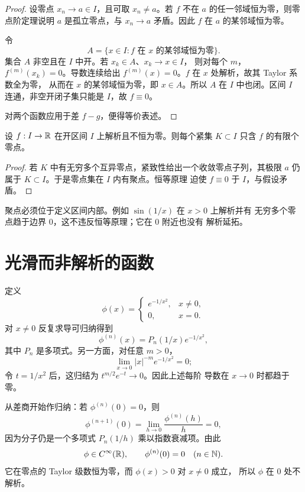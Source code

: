 \begin{proof}
设零点 \(x_n\to a\in I\)，且可取 \(x_n\ne a\)。若 \(f\) 不在
\(a\) 的任一邻域恒为零，则零点阶定理说明 \(a\) 是孤立零点，与
\(x_n\to a\) 矛盾。因此 \(f\) 在 \(a\) 的某邻域恒为零。

令
\[
 A=\{x\in I:f\text{ 在 }x\text{ 的某邻域恒为零}\}.
\]
集合 \(A\) 非空且在 \(I\) 中开。若 \(x_k\in A\)、\(x_k\to x\in I\)，
则对每个 \(m\)，\(f^{(m)}(x_k)=0\)。导数连续给出
\(f^{(m)}(x)=0\)。\(f\) 在 \(x\) 处解析，故其 Taylor 系数全为零，
从而在 \(x\) 的某邻域恒为零，即 \(x\in A\)。所以 \(A\) 在 \(I\)
中也闭。区间 \(I\) 连通，非空开闭子集只能是 \(I\)，故 \(f\equiv0\)。

对两个函数应用于差 \(f-g\)，便得等价表述。
\end{proof}

\begin{corollary}[紧集中的零点]
\label{cor:analytic-zeros-compact-finite}
设 \(f:I\to\mathbb{R}\) 在开区间 \(I\) 上解析且不恒为零。则每个紧集
\(K\subset I\) 只含 \(f\) 的有限个零点。
\end{corollary}

\begin{proof}
若 \(K\) 中有无穷多个互异零点，紧致性给出一个收敛零点子列，其极限
\(a\) 仍属于 \(K\subset I\)。于是零点集在 \(I\) 内有聚点。恒等原理
迫使 \(f\equiv0\) 于 \(I\)，与假设矛盾。
\end{proof}

聚点必须位于定义区间内部。例如 \(\sin(1/x)\) 在 \(x>0\) 上解析并有
无穷多个零点趋于边界 \(0\)，这不违反恒等原理；它在 \(0\) 附近也没有
解析延拓。

\section{光滑而非解析的函数}

定义
\[
 \phi(x)=
 \begin{cases}
 e^{-1/x^2},&x\ne0,\\
 0,&x=0.
 \end{cases}
\]
对 \(x\ne0\) 反复求导可归纳得到
\[
 \phi^{(n)}(x)=P_n(1/x)e^{-1/x^2},
\]
其中 \(P_n\) 是多项式。另一方面，对任意 \(m>0\)，
\[
 \lim_{x\to0}|x|^{-m}e^{-1/x^2}=0;
\]
令 \(t=1/x^2\) 后，这归结为 \(t^{m/2}e^{-t}\to0\)。因此上述每阶
导数在 \(x\to0\) 时都趋于零。

从差商开始作归纳：若 \(\phi^{(n)}(0)=0\)，则
\[
 \phi^{(n+1)}(0)
 =\lim_{h\to0}\frac{\phi^{(n)}(h)}h=0,
\]
因为分子仍是一个多项式 \(P_n(1/h)\) 乘以指数衰减项。由此
\[
 \phi\in C^\infty(\mathbb{R}),\qquad
 \phi^{(n)}(0)=0\quad(n\in\mathbb{N}).
\]
它在零点的 Taylor 级数恒为零，而 \(\phi(x)>0\) 对 \(x\ne0\) 成立，
所以 \(\phi\) 在 \(0\) 处不解析。

